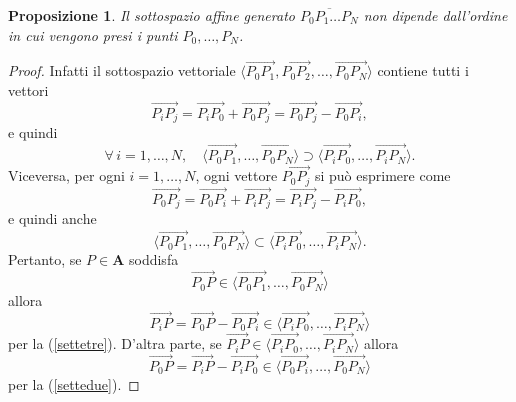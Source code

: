 \documentclass{article}
\theoremstyle{plain}
\newtheorem{prop}[thm]{Proposizione}
\theoremstyle{definition}
\theoremstyle{remark}
\begin{document}
\vspace{10pt}

\begin{bxthm}
\begin{prop}
    Il sottospazio affine generato $\overline{P_0P_1\dots P_N}$ non dipende dall'ordine in cui vengono presi i punti $P_0,\dots,P_N$.
\end{prop}
\end{bxthm}
\begin{proof}
    Infatti il sottospazio vettoriale $\langle\overrightarrow{P_0P_1},\overrightarrow{P_0P_2},\dots,\overrightarrow{P_0P_N}\rangle$
contiene tutti i vettori 
\[ \overrightarrow{P_iP_j}=\overrightarrow{P_iP_0}+\overrightarrow{P_0P_j}=\overrightarrow{P_0P_j}-\overrightarrow{P_0P_i}, \]
e quindi 
\begin{equation}\label{settedue}
    \forall\,i=1,\dots,N,\quad\langle\overrightarrow{P_0P_1},\dots,\overrightarrow{P_0P_N}\rangle\supset\langle\overrightarrow{P_iP_0},\dots,\overrightarrow{P_iP_N}\rangle.
\end{equation}
Viceversa, per ogni $i=1,\dots,N$, ogni vettore $\overrightarrow{P_0P_j}$ si può esprimere come 
\[ \overrightarrow{P_0P_j}=\overrightarrow{P_0P_i}+\overrightarrow{P_iP_j}=\overrightarrow{P_iP_j}-\overrightarrow{P_iP_0}, \]
e quindi anche
\begin{equation}\label{settetre}
    \langle\overrightarrow{P_0P_1},\dots,\overrightarrow{P_0P_N}\rangle\subset\langle\overrightarrow{P_iP_0},\dots,\overrightarrow{P_iP_N}\rangle.
\end{equation} 
Pertanto, se $P\in\mathbf{A}$ soddisfa 
\[\overrightarrow{P_0P}\in\langle\overrightarrow{P_0P_1},\dots,\overrightarrow{P_0P_N}\rangle\]
allora 
\[\overrightarrow{P_iP}=\overrightarrow{P_0P}-\overrightarrow{P_0P_i}\in\langle\overrightarrow{P_iP_0},\dots,\overrightarrow{P_iP_N}\rangle\] per la (\ref{settetre}).
D'altra parte, se $\overrightarrow{P_iP}\in\langle\overrightarrow{P_iP_0},\dots,\overrightarrow{P_iP_N}\rangle$
allora 
\[\overrightarrow{P_0P}=\overrightarrow{P_iP}-\overrightarrow{P_iP_0}\in\langle\overrightarrow{P_0P_i},\dots,\overrightarrow{P_0P_N}\rangle\] per la (\ref{settedue}).
\end{proof}

\vspace{10pt}
\end{document}
